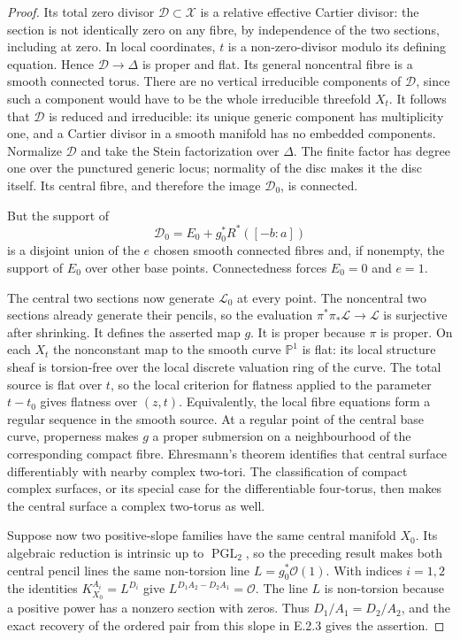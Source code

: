 \begin{proof}
Its total zero divisor $\mathcal D\subset\mathcal X$ is a
relative effective Cartier divisor: the section is not
identically zero on any fibre, by independence of the two
sections, including at zero.  In local coordinates, $t$ is
a non-zero-divisor modulo its defining equation.  Hence
$\mathcal D\to\Delta$ is proper and flat.  Its general
noncentral fibre is a smooth connected torus.  There are no
vertical irreducible components of $\mathcal D$, since such
a component would have to be the whole irreducible
threefold $X_t$.  It follows that $\mathcal D$ is reduced
and irreducible: its unique generic component has multiplicity
one, and a Cartier divisor in a smooth manifold has no
embedded components.  Normalize $\mathcal D$ and take the
Stein factorization over $\Delta$.  The finite factor has
degree one over the punctured generic locus; normality of
the disc makes it the disc itself.  Its central fibre, and
therefore the image $\mathcal D_0$, is connected.

But the support of
\[
 \mathcal D_0=E_0+g_0^*R^*([-b:a])
\]
is a disjoint union of the $e$ chosen smooth connected fibres
and, if nonempty, the support of $E_0$ over other base points.
Connectedness forces $E_0=0$ and $e=1$.

The central two sections now generate $\mathcal L_0$ at
every point.  The noncentral two sections already generate
their pencils, so the evaluation
$\pi^*\pi_*\mathcal L\to\mathcal L$ is surjective after
shrinking.  It defines the asserted map $g$.  It is proper
because $\pi$ is proper.  On each $X_t$ the nonconstant
map to the smooth curve $\mathbb P^1$ is flat: its local
structure sheaf is torsion-free over the local discrete
valuation ring of the curve.  The total source is flat
over $t$, so the local criterion for flatness applied to
the parameter $t-t_0$ gives flatness over $(z,t)$.
Equivalently, the local fibre equations form a regular
sequence in the smooth source.  At a regular
point of the central base curve, properness makes $g$ a
proper submersion on a neighbourhood of the corresponding
compact fibre.  Ehresmann's theorem identifies that central
surface differentiably with nearby complex two-tori.
The classification of compact complex surfaces, or its
special case for the differentiable four-torus, then makes
the central surface a complex two-torus as well.

Suppose now two positive-slope families have the same
central manifold $X_0$.  Its algebraic reduction is intrinsic
up to $\operatorname{PGL}_2$, so the preceding result makes
both central pencil lines the same non-torsion line
$L=g_0^*\mathcal O(1)$.  With indices $i=1,2$ the identities
$K_{X_0}^{A_i}=L^{D_i}$ give
$L^{D_1A_2-D_2A_1}=\mathcal O$.  The line $L$ is non-torsion
because a positive power has a nonzero section with zeros.
Thus $D_1/A_1=D_2/A_2$, and the exact recovery of the ordered
pair from this slope in E.2.3 gives the assertion.


\end{proof}
